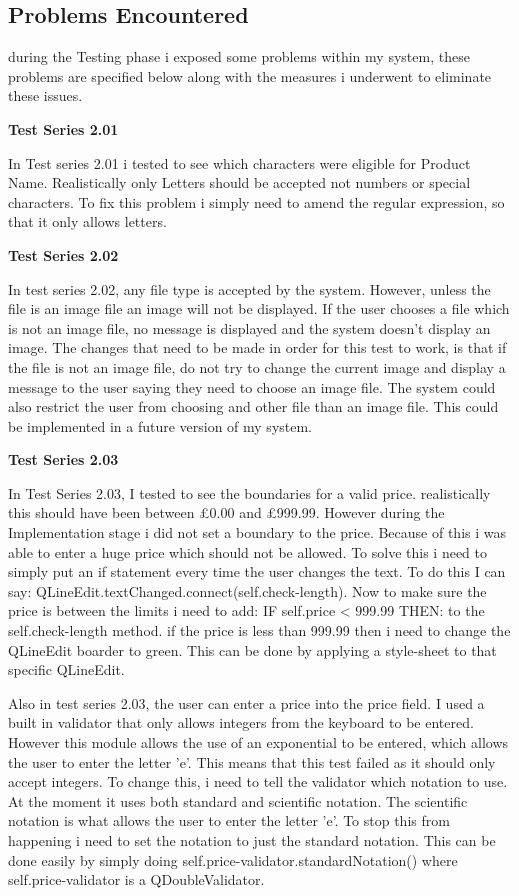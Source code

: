 \subsection{Problems Encountered}

during the Testing phase i exposed some problems within my system, these problems are specified below along with the measures i underwent to eliminate these issues. 

\textbf{Test Series 2.01}

In Test series 2.01 i tested to see which characters were eligible for Product Name. Realistically only Letters should be accepted not numbers or special characters. To fix this problem i simply need to amend the regular expression, so that it only allows letters. 


\textbf{Test Series 2.02}

In test series 2.02, any file type is accepted by the system. However, unless the file is an image file an image will not be displayed. If the user chooses a file which is not an image file, no message is displayed and the system doesn't display an image. The changes that need to be made in order for this test to work, is that if the file is not an image file, do not try to change the current image and display a message to the user saying they need to choose an image file. The system could also restrict the user from choosing and other file than an image file. This could be implemented in a future version of my system.

\textbf{Test Series 2.03}

In Test Series 2.03, I tested to see the boundaries for a valid price. realistically this should have been between £0.00 and £999.99. However during the Implementation stage i did not set a boundary to the price. Because of this i was able to enter a huge price which should not be allowed. To solve this i need to simply put an if statement every time the user changes the text. To do this I can say: QLineEdit.textChanged.connect(self.check-length). Now to make sure the price is between the limits i need to add: IF self.price < 999.99 THEN: to the self.check-length method. if the price is less than 999.99 then i need to change the QLineEdit boarder to green. This can be done by applying a style-sheet to that specific QLineEdit.

Also in test series 2.03, the user can enter a price into the price field. I used a built in validator that only allows integers from the keyboard to be entered. However this module allows the use of an exponential to be entered, which allows the user to enter the letter 'e'. This means that this test failed as it should only accept integers. To change this, i need to tell the validator which notation to use. At the moment it uses both standard and scientific notation. The scientific notation is what allows the user to enter the letter 'e'. To stop this from happening i need to set the notation to just the standard notation. This can be done easily by simply doing self.price-validator.standardNotation() where self.price-validator is a QDoubleValidator.

